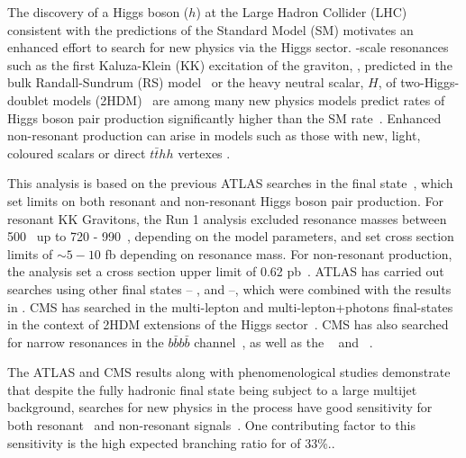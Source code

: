 The discovery of a Higgs boson ($h$) \cite{Aad:2012tfa,Chatrchyan201230} at the Large Hadron Collider (LHC) consistent with the predictions of the Standard Model (SM) \cite{ATLAS:HiggsCouplings,PhysRevD.89.092007} motivates an enhanced effort to search for new physics via the Higgs sector.  
\TeV-scale resonances such as the first Kaluza-Klein (KK) excitation of the graviton,
\Grav, predicted in the bulk Randall-Sundrum (RS) model~\cite{Agashe:2007zd,Fitzpatrick} or the heavy neutral scalar, $H$, of two-Higgs-doublet models (2HDM)~\cite{Branco:2011iw} are among many new physics models predict rates of Higgs boson pair production significantly higher than the SM rate~\cite{PhysRevD.58.115012,Grigo20131,PhysRevLett.111.201801}. Enhanced non-resonant \pptohh production can arise in models such as those with new, light, coloured scalars \cite{PhysRevD.86.095023} or direct $t\bar{t}hh$ vertexes \cite{Grober:2010yv,Contino:2012xk}.

This analysis is based on the previous ATLAS searches in the \bbbb final state~\cite{ATLASHHbbbb, ATLAS-CONF-2016-017}, which set limits on both resonant and non-resonant Higgs boson pair production.  For resonant KK Gravitons, the Run 1 analysis excluded resonance masses between 500 \GeV\ up to 720 - 990~\GeV, depending on the model parameters, and set cross section limits of $\sim 5-10$ fb depending on resonance mass.  For non-resonant production, the analysis set a cross section upper limit of 0.62 pb~\cite{ATLASHHComb}.  ATLAS has carried out searches using other final states -- \bbgg, \bbtautau and \WWgg --, which were combined with the \bbbb results in \cite{ATLASHHComb}. CMS has searched in the multi-lepton and multi-lepton+photons final-states in the context of 2HDM extensions of the Higgs sector~\cite{Khachatryan:2014jya}. CMS has also searched for narrow resonances in the $b\bar{b}b\bar{b}$ channel~\cite{Khachatryan:2015yea}, as well as the \bbgg~\cite{CMSbbgammagamma} and \bbtautau~\cite{CMSbbtt}.

The ATLAS and CMS results along with phenomenological studies demonstrate that despite the fully hadronic final state being subject to a large multijet background, searches for new physics in the \pptofourb process have good sensitivity for both resonant~\cite{PhenoBBBB,GouzevitchBBBBPheno} and non-resonant signals~\cite{DeLimaBBBB, Wardrope:2014kya}. One contributing factor to this sensitivity is the high expected branching ratio for \hhbbbb of 33\%.. 

